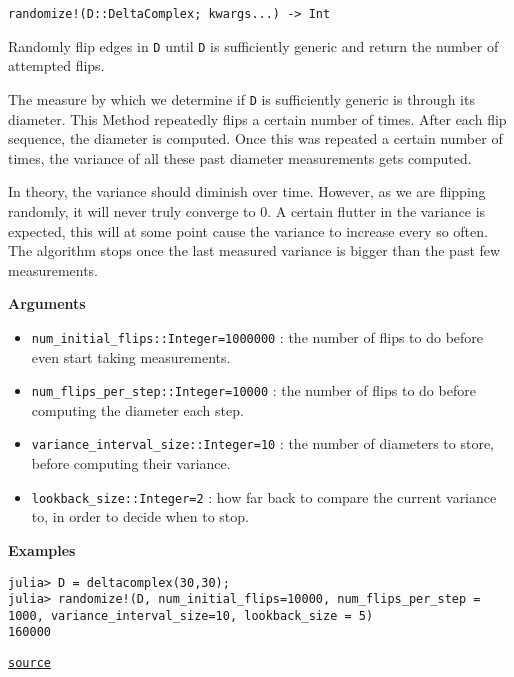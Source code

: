 \begin{adjustwidth}{2em}{0pt}


\begin{verbatim}
randomize!(D::DeltaComplex; kwargs...) -> Int
\end{verbatim}

Randomly flip edges in \texttt{D} until \texttt{D} is sufficiently generic and return the number of attempted flips.

The measure by which we determine if \texttt{D} is sufficiently generic is through its diameter. This Method repeatedly flips a certain number of times. After each flip sequence, the diameter is computed. Once this was repeated a certain number of times, the variance of all these past diameter measurements gets computed.

In theory, the variance should diminish over time. However, as we are flipping randomly, it will never truly converge to 0. A certain flutter in the variance is expected, this will at some point cause the variance to increase every so often. The algorithm stops once the last measured variance is bigger than the past few measurements.

\textbf{Arguments}

\begin{itemize}
\item \texttt{num\_initial\_flips::Integer=1000000} : the number of flips to do before even start taking measurements.


\item \texttt{num\_flips\_per\_step::Integer=10000} : the number of flips to do before computing the diameter each step.


\item \texttt{variance\_interval\_size::Integer=10} : the number of diameters to store, before computing their variance. 


\item \texttt{lookback\_size::Integer=2} : how far back to compare the current variance to, in order to decide when to stop. 

\end{itemize}
\textbf{Examples}


\begin{verbatim}
julia> D = deltacomplex(30,30);
julia> randomize!(D, num_initial_flips=10000, num_flips_per_step = 1000, variance_interval_size=10, lookback_size = 5)
160000
\end{verbatim}



\href{https://github.com/schto223/FlipGraphs.jl/blob/e35d43698a06b86273148826b79d585ba04fcd26/src/deltaComplex.jl#L1033-L1059}{\texttt{source}}


\end{adjustwidth}

